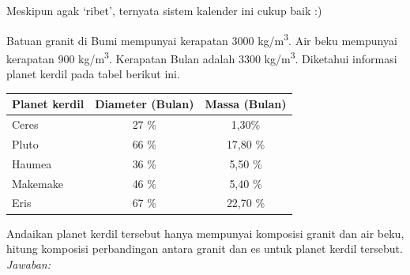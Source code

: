 \documentclass[11pt,fleqn]{exam}
\begin{document}
\begin{questions}
\begin{enumerate}[(a)]
Meskipun agak `ribet', ternyata sistem kalender ini cukup baik :)

\end{enumerate}

\vspace{0.3cm}
\question Batuan granit di Bumi mempunyai kerapatan 3000 kg/m\textsuperscript{3}. Air beku mempunyai kerapatan 900 kg/m\textsuperscript{3}. Kerapatan Bulan adalah 3300 kg/m\textsuperscript{3}. Diketahui informasi planet kerdil pada tabel berikut ini.

\begin{table}[h!]
\centering
\begin{tabular}{|l|c|c|}
\hline
Planet kerdil & Diameter (Bulan) & Massa (Bulan) \\
\hline
\hline
Ceres & 27 \% & 1,30\% \\
\hline
Pluto & 66 \% & 17,80 \% \\
\hline
Haumea & 36 \% & 5,50 \% \\
\hline
Makemake & 46 \% & 5,40 \% \\
\hline
Eris & 67 \% & 22,70 \% \\
\hline
\end{tabular}
\end{table}

Andaikan planet kerdil tersebut hanya mempunyai komposisi granit dan air beku, hitung komposisi perbandingan antara granit dan es untuk planet kerdil tersebut.\\

\textit{Jawaban: } 


\end{questions}
\end{document}
